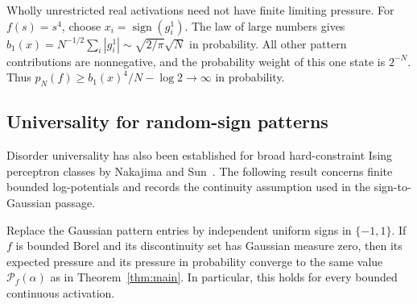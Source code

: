 \begin{remark}\label{ext:growth}
Wholly unrestricted real activations need not have finite limiting
pressure. For $f(s)=s^4$, choose $x_i=\operatorname{sign}(g_i^1)$. The law
of large numbers gives
$b_1(x)=N^{-1/2}\sum_i|g_i^1|\sim\sqrt{2/\pi}\sqrt N$ in probability.
All other pattern contributions are nonnegative, and the probability
weight of this one state is $2^{-N}$. Thus
$p_N(f)\ge b_1(x)^4/N-\log2\to\infty$ in probability.
\end{remark}

\subsection{Universality for random-sign patterns}

Disorder universality has also been established for broad hard-constraint
Ising perceptron classes by Nakajima and Sun~\cite{nakajimasun2022}.
The following result concerns finite bounded log-potentials and records
the continuity assumption used in the sign-to-Gaussian passage.

\begin{theorem}\label{ext:sign}
Replace the Gaussian pattern entries by independent uniform signs in
$\{-1,1\}$. If $f$ is bounded Borel and its discontinuity set has Gaussian
measure zero, then its expected pressure and its pressure in probability
converge to the same value $\mathcal P_f(\alpha)$ as in
Theorem~\ref{thm:main}. In particular, this holds for every bounded
continuous activation.
\end{theorem}

